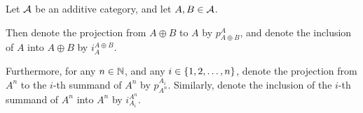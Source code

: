 \begin{notation}
    Let \( {\mathcal{A}} \) be an additive category, and let \( A, B \in {\mathcal{A}} \).

    Then denote the projection from \( A \oplus B \) to \( A \) by \( p_{A \oplus B}^A \), and denote the inclusion of \( A \) into \( A \oplus B \) by \( i_A^{A \oplus B} \).

    Furthermore, for any \( n \in {\mathbb{N}} \), and any \( i \in \left\{ 1, 2, \dots, n \right\} \), denote the projection from \( A^n \) to the \( i \)-th summand of \( A^n \) by \( p_{A^n}^{A_i} \). Similarly, denote the inclusion of the \( i \)-th summand of \( A^n \) into \( A^n \) by \( i_{A_i}^{A^n} \).
\end{notation}


